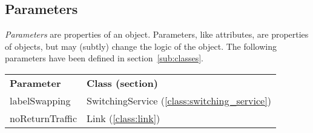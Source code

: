 \subsection{Parameters}
\label{sub:parameters}

\emph{Parameters} are properties of an object.
Parameters, like attributes, are properties of objects, but may (subtly) change 
the logic of the object.
The following parameters have been defined in section~\ref{sub:classes}.

\begin{tabular}{@{}p{}p{}}
\textbf{Parameter} &                         \textbf{Class (section)}\\
     labelSwapping & SwitchingService (\ref{class:switching_service})\\
   noReturnTraffic &                          Link (\ref{class:link})\\

\end{tabular}

